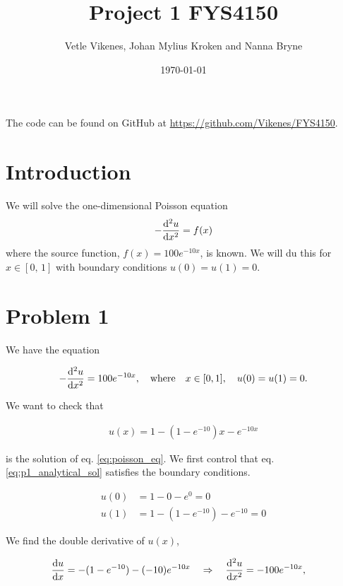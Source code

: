 \documentclass[english,notitlepage,nofootinbib]{revtex4-1}  %
\begin{document}
\title{Project 1 FYS4150} 
\author{Vetle Vikenes, Johan Mylius Kroken and Nanna Bryne}      
\date{\today}                 
\noaffiliation       

\maketitle 
The code can be found on GitHub at \url{https://github.com/Vikenes/FYS4150}.
    
\section*{Introduction}
We will solve the one-dimensional Poisson equation 
\begin{align*}
    - \dv[2]{u}{x}=f(x)
\end{align*}
where the source function, $f(x)=100e^{-10x}$, is known. We will du this for $x\in[0,\,1]$ with boundary conditions $u(0)=u(1)=0$.

\section*{Problem 1}

We have the equation 

\begin{align}\label{eq:poisson_eq}
    -\dv[2]{u}{x} =  100e^{-10x}, \quad \text{where} \quad x\in [0,1], \quad u(0)=u(1)=0.
\end{align}


We want to check that 

\begin{align}\label{eq:p1_analytical_sol}
    u(x) = 1 - (1-e^{-10})x - e^{-10x}
\end{align}

is the solution of eq. \ref{eq:poisson_eq}. We first control that eq. \ref{eq:p1_analytical_sol} satisfies the boundary conditions. 

\begin{align*}
    u(0) &= 1 - 0 - e^{0} = 0 \\
    u(1) &= 1 - (1-e^{-10}) - e^{-10} = 0
\end{align*}
 
We find the double derivative of $u(x)$,

\begin{align*}
    \dv{u}{x} &= -(1-e^{-10}) - (-10)e^{-10x} \quad \Rightarrow \quad \dv[2]{u}{x} = -100e^{-10x},
\end{align*}
\end{document}
